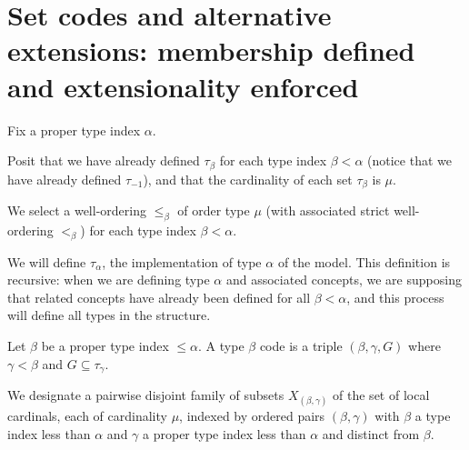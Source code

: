 \section{Set codes and alternative extensions:  membership defined and extensionality enforced}

\begin{definition}
\label {def:alpha}
Fix a proper type index $\alpha$.
\end{definition}

\begin{definition}
\label {def:oldtau}
Posit that we have already defined $\tau_\beta$ for each type index $\beta<\alpha$ (notice that we have already defined $\tau_{-1}$), and that the cardinality of each set $\tau_\beta$ is $\mu$.
\end{definition}

\begin{definition}
\label {def:typewords}
We select a well-ordering $\leq_\beta$ of order type $\mu$ (with associated strict well-ordering $<_\beta$) for each type index $\beta<\alpha$.
\end{definition}

We will define $\tau_\alpha$, the implementation of type $\alpha$ of the model.  This definition is recursive:  when we are defining type $\alpha$ and associated concepts, we are supposing that related concepts have already been defined for all $\beta<\alpha$, and this process will define all types in the structure.

\begin{definition}
\label {def:codes}
Let $\beta$ be a proper type index $\leq \alpha$.
A type $\beta$ code is a triple $(\beta,\gamma,G)$ where $\gamma<\beta$ and $G \subseteq \tau_{\gamma}$.
\end{definition}







\begin{definition}
\label {def:ftargets}
We designate a pairwise disjoint family of subsets $X_{(\beta,\gamma)}$ of the set of local cardinals, each of cardinality $\mu$, indexed by ordered pairs $(\beta,\gamma)$ with $\beta$ a type index less than $\alpha$ and $\gamma$ a proper type index less than $\alpha$ and distinct from $\beta$.
\end{definition}

